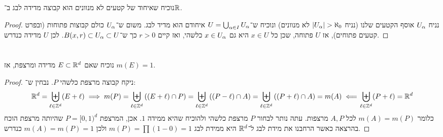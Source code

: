 \documentclass[]{../../../../tex/classes/homework}
\begin{document}
	\section{}
	נוכיח שאיחוד של קטעים לא מנוונים הוא קבוצה מדידה לבג ב־$\mathbb{R}$. 
	\begin{proof}
		נניח $U_\alpha$ אוסף הקטעים שלנו (נניח $\left \lvert U_\alpha \right \rvert > \aleph_0$ לא מנוונים) ונוכיח ש־$U = \bigcup_{\alpha \in I} U_\alpha$ איחודם הוא מדיד לבג. משום ש־$U_\alpha$ כולם קבוצות פתוחות (ובפרט קטעים פתוחים), אז $U$ פתוחה, שכן כל $x \in U$ היא גם $x \in U_\alpha$ כלשהי, ואז קיים $r > 0$ כך ש־$B(x, r) \subset U_\alpha \subset U$. לכן $U$ מדידה כנדרש. 
	\end{proof}
	
	
	\section{}
	נוכיח שאם $E \subset \mathbb{R}^{d}$ מדידה ומרצפת, אז $m(E) = 1$. \begin{proof}

		ניקח קבוצה מרצפת כלשהי $P$. נבחין ש־: 
		\[ \mathbb{R}^{d} = \biguplus_{\ell \in \mathbb{Z}^{d}}(E + \ell) \implies m(P) = \biguplus_{\ell \in \mathbb{Z}^{d}}{\left ( (E + \ell) \cap P \right )} = \biguplus_{\ell \in \mathbb{Z}^{d}}{((P - \ell) \cap A)} = \biguplus_{\ell \in \mathbb{Z}^{d}}{((P + \ell) \cap A)} = m(A) \impliedby \!\biguplus_{\ell \in \mathbb{Z}^{d}}(P + \ell) = \mathbb{R}^{d} \]
		כלומר $m(A) = m(P)$ לכל $A, P$ מרצפות. עתה נותר לבחור $P$ מרצפת כלשהי ולהוכיח שהיא ממידה $1$. אכן, המרצפת $P = [0, 1)^{d}$ שהיותה מרצפת הוכח בהרצאה כאשר הרחבנו את מידת לבג ל־$\mathbb{R}^{d}$ היא ממידת לבג $m(P) = \prod (1 - 0) = 1$ ולכן $m(A) = m(P) = 1$ כנדרש. 
	\end{proof}
	
	\ndoc
\end{document}
